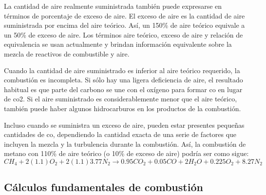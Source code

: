 \par La cantidad de aire realmente suministrada también puede expresarse en términos de porcentaje de exceso de aire. El exceso de aire es la cantidad de aire suministrada por encima del aire teórico. Así, un 150\% de aire teórico equivale a un 50\% de exceso de aire. Los términos aire teórico, exceso de aire y relación de equivalencia se usan actualmente y brindan información equivalente sobre la mezcla de reactivos de combustible y aire.
\par Cuando la cantidad de aire suministrado es inferior al aire teórico requerido, la combustión es incompleta. Si sólo hay una ligera deficiencia de aire, el resultado habitual es que parte del carbono se une con el oxígeno para formar \ac{co} en lugar de \ac{co2}. Si el aire suministrado es considerablemente menor que el aire teórico, también puede haber algunos hidrocarburos en los productos de la combustión.
\par Incluso cuando se suministra un exceso de aire, pueden estar presentes pequeñas cantidades de \ac{co}, dependiendo la cantidad exacta de una serie de factores que incluyen la mezcla y la turbulencia durante la combustión. Así, la combustión de metano con 110\% de aire teórico (o 10\% de exceso de aire) podría ser como sigue:
\begin{equation}
CH_4 + 2(1.1)O_2 + 2(1.1)3.77N_2 \rightarrow 0.95CO_2 + 0.05 CO + 2H_2O + 0.225O_2 + 8.27N_2
\end{equation}

\subsection{Cálculos fundamentales de combustión}
